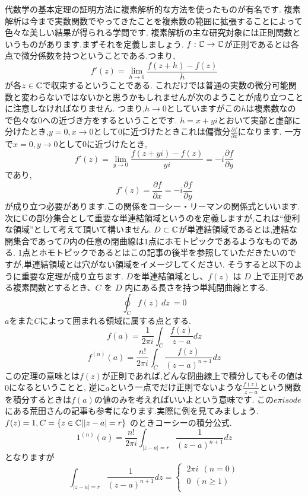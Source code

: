 \exx
{}
代数学の基本定理の証明方法に複素解析的な方法を使ったものが有名です.
複素解析は今まで実数関数でやってきたことを複素数の範囲に拡張することによって色々な美しい結果が得られる学問です.
複素解析の主な研究対象には正則関数というものがあります.まずそれを定義しましょう.
$f:\mathbb C \to \mathbb C$が正則であるとは各点で微分係数を持つということである.つまり,
\[
f'(z) = \lim_{h\to 0} \frac{f(z+h) - f(z)}{h}
\]
が各$z\in\mathbb C$で収束するということである.
\rem
これだけでは普通の実数の微分可能関数と変わらないではないかと思うかもしれませんが次のようことが成り立つことに注意しなければなりません.
つまり,$h\to 0$としていますがこの$h$は複素数なので色々な$0$への近づき方をするということです.
$h=x+yi$とおいて実部と虚部に分けたとき,$y=0,x\to 0$として$0$に近づけたときこれは偏微分$\frac{\partial f}{\partial x}$になります.
一方で$x=0,y\to 0$として$0$に近づけたとき,
\[
f'(z) = \lim_{y\to 0} \frac{f(z+yi)-f(z)}{yi} = -i\frac{\partial f}{\partial y}
\]
であり,
\[
f'(z) = \frac{\partial f}{\partial x} = -i\frac{\partial f}{\partial y}
\]
が成り立つ必要があります.この関係をコーシー・リーマンの関係式といいます.
\remx
次に$\mathbb C$の部分集合として重要な単連結領域というのを定義しますが,これは``便利な領域''として考えて頂いて構いません.
$D \subset \mathbb C$が単連結領域であるとは,連結な開集合であって$D$内の任意の閉曲線は$1$点にホモトピックであるようなものである.
$1$点とホモトピックであるとはこの記事の後半を参照していただきたいのですが,単連結領域とは穴がない領域をイメージしてください.
そうすると以下のように重要な定理が成り立ちます.
\thm[コーシーの積分定理と積分公式]
$D$を単連結領域とし、$f(z)$ は $D$ 上で正則である複素関数とするとき、$C$ を $D$ 内にある長さを持つ単純閉曲線とする.
\[
 \oint_C f(z) \, dz\ = 0
\]
$a$をまた$C$によって囲まれる領域に属する点とする.
\[
 f(a) = \frac{1}{2 \pi i}\int_C \frac{f(z)}{z-a}dz
\]
\[
 f^{(n)}(a) = \frac{n!}{2 \pi i}\int_C \frac{f(z)}{(z-a)^{n+1}}dz
\]
\thmx
この定理の意味とは$f(z)$が正則であれば,どんな閉曲線上で積分してもその値は$0$になるということと,
逆に$a$という一点でだけ正則でないような$\frac{f(z)}{z-a}$という関数を積分するときは$f(a)$の値のみを考えればいいよという意味です.
この$e\pi isode$にある荒田さんの記事も参考になります.実際に例を見てみましょう.
\ex[コーシーの積分公式の例]
$f(z) = 1 , C = \{z\in\mathbb C | |z-a|=r\} $ のときコーシーの積分公式.\\
\[
1^{(n)}(a) = \frac{n!}{2 \pi i}\int_{|z-a|=r} \frac{1}{(z-a)^{n+1}} dz 
\]
となりますが
\[
 \int_{|z-a|=r} \frac{1}{(z-a)^{n+1}} dz =
  \begin{cases}
   \  2\pi i  \ \ (n=0) \\
   \  0 \ \ (n \ge 1) \\
  \end{cases}
\]
